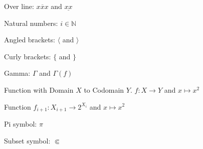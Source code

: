 \documentclass[12pt]{article}
\theoremstyle{definition}
\begin{document}
Over line: $\overline{xxx}$ and $\underline{xx}$

Natural numbers: $i \in \mathbb{N} $

Angled brackets: $\langle$ and $\rangle$

Curly brackets: $\lbrace$ and $\rbrace$

Gamma: $\Gamma$ and $\Gamma(f)$

Function with Domain $X$ to Codomain $Y$. $f: X \to Y$ and $x \mapsto x^2$

Function $f_{i+1}: X_{i+1} \to 2^{X_i}$ and $x \mapsto x^2$

Pi symbol: $\pi$

Subset symbol: $\Subset$
\end{document}
